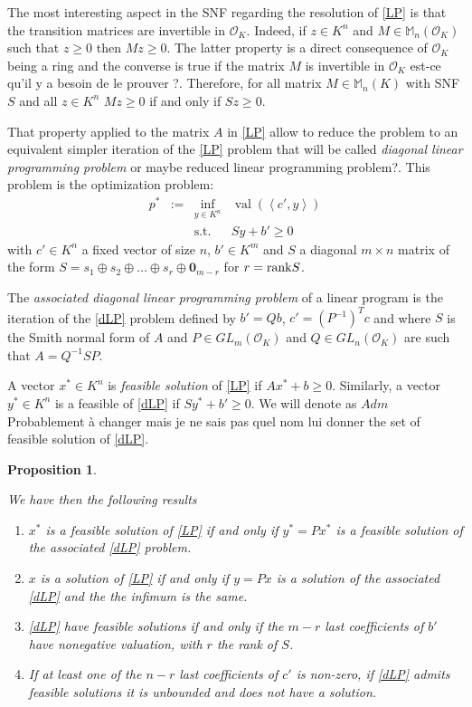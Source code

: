 \documentclass[a4paper,12pt]{article}
\newtheorem{proposition}[theorem]{Proposition}
\newcommand{\allmat}{\mathbb{M}} %
\newcommand{\corentin}[1]{{\color{red} #1}} %
\DeclareMathOperator{\val}{val}
\newcommand{\OK}{\mathcal{O}_K}
\begin{document}
The most interesting aspect in the SNF regarding the resolution of \ref{LP} is that the transition matrices are invertible in $\OK$. Indeed, if $z \in K^n$ and $M \in \allmat_n(\OK)$ such that $z \geq 0$ then $Mz \geq 0$. The latter property is a direct consequence of $\OK$ being a ring and the converse is true if the matrix $M$ is invertible in $\OK$ \corentin{est-ce qu'il y a besoin de le prouver ?}. Therefore, for all matrix $M \in \allmat_n(K)$ with SNF $S$ and all $z \in K^n$ $Mz \geq 0$ if and only if $Sz \geq 0$. 

That property applied to the matrix $A$ in \ref{LP} allow to reduce the problem to an equivalent simpler iteration of the \ref{LP} problem that will be called {\it diagonal linear programming problem} \corentin{or maybe reduced linear programming problem?}. This problem is the optimization problem: 
\begin{equation}
  \tag{dLP}\label{dLP}
\begin{array}{rcll}
  p^* & := & \inf_{y \in K^n} & \val(\left\langle c', y \right\rangle) \\
  &    & \text{s.t.}         & S y + b' \geq 0
\end{array}
\end{equation}
with $c' \in K^n$ a fixed vector of size $n$, $b' \in K^m$ and $S$ a diagonal $m \times n$ matrix of the form $S = s_1 \oplus s_2 \oplus \ldots \oplus s_r \oplus { \bm 0}_{m-r} $ for $r={\rm rank} S$.

The {\it associated diagonal linear programming problem} of a linear program is the iteration of the \ref{dLP} problem defined by $b' = Qb$, $c' = \left(P^{-1}\right)^T c$ and where $S$ is the Smith normal form of $A$ and $P \in GL_m\left( \OK \right)$ and $ Q \in GL_n\left( \OK \right)$ are such that $A = Q^{-1} S P$.

A vector $x^* \in K^n$ is {\it feasible solution} of \ref{LP} if $Ax^* + b \geq 0$. Similarly, a vector $y^* \in K^n$ is a feasible of \ref{dLP} if $Sy^*+b' \geq 0$. We will denote as $Adm$ \corentin{Probablement à changer mais je ne sais pas quel nom lui donner} the set of feasible solution of \ref{dLP}.

\begin{proposition}\label{prop:reduc}
	
	We have then the following results
	\begin{enumerate}
		\item $x^*$ is a feasible solution of \ref{LP} if and only if $y^* = P x^*$ is a feasible solution of the associated \ref{dLP} problem.
		\item $x$ is a solution of \ref{LP} if and only if $y = P x$ is a solution of the associated \ref{dLP} and the the infimum is the same.
		\item \ref{dLP} have feasible solutions if and only if the $m-r$ last coefficients of $b'$ have nonegative valuation, with $r$ the rank of $S$.
		\item If at least one of the $n-r$ last coefficients of $c'$ is non-zero, if \ref{dLP} admits feasible solutions it is unbounded and does not have a solution.
		 
  \end{enumerate}
\end{proposition}
	
\end{document}
